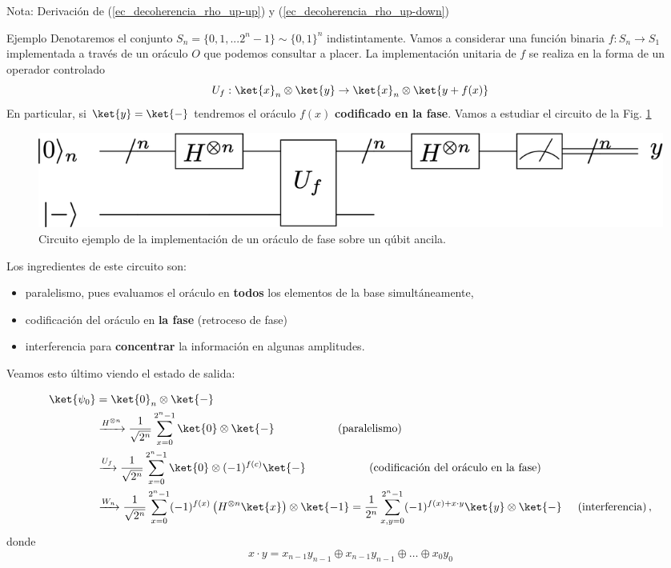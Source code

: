 \documentclass[a4paper,11pt]{book} %
\numberwithin{equation}{chapter}
\def\lp{\left(}
\def\rp{\right)}
\begin{document}
\begin{mybox_blue}{Nota: Derivación de (\ref{ec_decoherencia_rho_up-up}) y  (\ref{ec_decoherencia_rho_up-down})}
	\begin{mybox_green}{Ejemplo}
	Denotaremos el conjunto $S_n =\{0,1,...2^n-1 \}\sim \{0,1\}^n$ indistintamente. Vamos a considerar una función binaria  $f:S_n \to S_1$ implementada
	 a través de un oráculo $O$ que podemos consultar a placer. La implementación unitaria de $f$ se realiza en la forma de un operador controlado
	$$
	{U_f} : \ket{x}_n\otimes \ket{y} \to \ket{x}_n\otimes \ket{y + f(x)}
	$$
	En particular, si $\ket{y} = \ket{-}$ tendremos el oráculo $f(x)$ \textbf{codificado en la fase}. Vamos a estudiar el circuito de la Fig. \ref{Fig_algoritmos_didac_Busqueda_Oraculo}
		\begin{figure}[H]
		\centering 
		\includegraphics[width=0.65\linewidth]{Figuras/Fig_algoritmos_didac_Busqueda_Oraculo.png}
		\caption{Circuito ejemplo de la implementación de un oráculo de fase sobre un qúbit ancila.}
		\label{Fig_algoritmos_didac_Busqueda_Oraculo}
		\end{figure}
		
	Los ingredientes de este circuito son:
	\begin{itemize}
		\item paralelismo, pues evaluamos el oráculo en \textbf{todos} los elementos de la base simultáneamente,
		\item codificación del oráculo en \textbf{la fase} (retroceso de fase)
		\item interferencia para \textbf{concentrar} la información en algunas amplitudes.
	\end{itemize}
    Veamos esto último viendo el estado de salida:
    
    \begin{align*}
    \ket{\psi_0} & = \ket{0}_n \otimes \ket{-} \\
    & \xrightarrow{H^{\otimes n}}   \frac{1}{\sqrt{2^n}} \sum^{2^n -1}_{x=0} \ket{0} \otimes \ket{-} \hspace{2cm} \text{(paralelismo)} \\
    & \xrightarrow{U_f}             \frac{1}{\sqrt{2^n}} \sum^{2^n -1}_{x=0} \ket{0} \otimes (-1)^{f(c)} \ket{-} \hspace{2cm} \text{(codificación del oráculo en la fase)} \\
    & \xrightarrow{W_n}  			\frac{1}{\sqrt{2^n}} \sum^{2^n -1}_{x=0} (-1)^{f(x)} \lp H^{\otimes n} \ket{x} \rp \otimes \ket{-1} = 
      \frac{1}{2^n} \sum^{2^n -1}_{x,y=0} (-1)^{f(x)+x\cdot y}  \ket{y} \otimes \ket{-}  \hspace{0.5cm}  \text{(interferencia)} \, ,
    \end{align*}
	donde
	$$
	x\cdot y = x_{n-1} y_{n-1} \oplus x_{n-1} y_{n-1} \oplus \ldots \oplus x_0 y_0
	$$
	

\end{mybox_green}
\end{mybox_blue}
\end{document}

